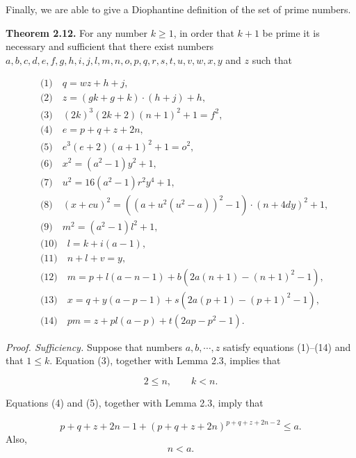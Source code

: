 \documentclass[10pt,letterpaper]{article}
\newcommand{\statement}[1]{\par\medskip\noindent\textbf{#1}\enspace}
\begin{document}
Finally, we are able to give a Diophantine definition of the set of prime numbers.

\statement{Theorem 2.12.} For any number $k \geq 1$, in order that $k+1$ be prime it is necessary and sufficient that there exist numbers $a, b, c, d, e, f, g, h, i, j, l, m, n, o, p, q, r, s, t, u, v, w, x, y$ and $z$ such that

\begin{align*}
&\text{(1)}\quad q=w z+h+j,\\
&\text{(2)}\quad z=(g k+g+k) \cdot(h+j)+h,\\
&\text{(3)}\quad (2 k)^{3}(2 k+2)(n+1)^{2}+1=f^{2},\\
&\text{(4)}\quad e=p+q+z+2 n,\\
&\text{(5)}\quad e^{3}(e+2)(a+1)^{2}+1=o^{2},\\
&\text{(6)}\quad x^{2}=\left(a^{2}-1\right) y^{2}+1,\\
&\text{(7)}\quad u^{2}=16\left(a^{2}-1\right) r^{2} y^{4}+1,\\
&\text{(8)}\quad (x+c u)^{2}=\left(\left(a+u^{2}\left(u^{2}-a\right)\right)^{2}-1\right) \cdot(n+4 d y)^{2}+1,\\
&\text{(9)}\quad m^{2}=\left(a^{2}-1\right) l^{2}+1,\\
&\text{(10)}\quad l=k+i(a-1),\\
&\text{(11)}\quad n+l+v=y,\\
&\text{(12)}\quad m=p+l(a-n-1)+b\left(2 a(n+1)-(n+1)^{2}-1\right),\\
&\text{(13)}\quad x=q+y(a-p-1)+s\left(2 a(p+1)-(p+1)^{2}-1\right),\\
&\text{(14)}\quad p m=z+p l(a-p)+t\left(2 a p-p^{2}-1\right).
\end{align*}

\textit{Proof. Sufficiency.} Suppose that numbers $a, b, \cdots, z$ satisfy equations (1)--(14) and that $1 \leq k$. Equation (3), together with Lemma 2.3, implies that


\begin{equation*}
2\leq n,\qquad k<n.\tag{$1^\prime,2^\prime$}
\end{equation*}


Equations (4) and (5), together with Lemma 2.3, imply that


\begin{equation*}
p+q+z+2n-1+(p+q+z+2n)^{p+q+z+2n-2}\leq a.\tag{$3^\prime$}
\end{equation*}
Also,
\begin{equation*}
n<a.\tag{$4^\prime$}
\end{equation*}
\end{document}
